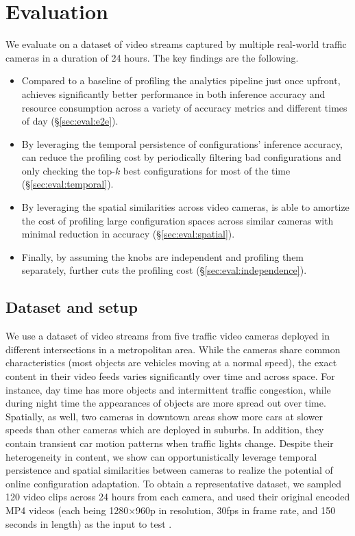 \section{Evaluation}

We evaluate \name on a dataset of video streams captured by multiple real-world traffic cameras in a duration of 24 hours. The key findings are the following.
\begin{itemize}
    \item Compared to a baseline of profiling the analytics pipeline just once upfront, \name achieves significantly better performance in both inference accuracy and resource consumption across a variety of accuracy metrics and different times of day (\S\ref{sec:eval:e2e}).
    \item By leveraging the temporal persistence of configurations' inference accuracy, \name can reduce the profiling cost by periodically filtering bad configurations and only checking the top-$k$ best configurations for most of the time  (\S\ref{sec:eval:temporal}).
    \item By leveraging the spatial similarities across video cameras, \name is able to amortize the cost of profiling large configuration spaces across similar cameras with minimal reduction in accuracy (\S\ref{sec:eval:spatial}).
    \item Finally, by assuming the knobs are independent and profiling them separately, \name further cuts the profiling cost
    (\S\ref{sec:eval:independence}).
\end{itemize}

\subsection{Dataset and setup}

We use a dataset of video streams from five traffic video cameras deployed in different intersections in a metropolitan area. While the cameras share common characteristics (\eg most objects are vehicles moving at a normal speed), the exact content in their video feeds varies significantly over time and across space. 
For instance, day time has more objects and intermittent traffic congestion, while during night time the appearances of objects are more spread out over time. Spatially, as well, two cameras in downtown areas show more cars at slower speeds than other cameras which are deployed in suburbs. In addition, they contain transient car motion patterns when traffic lights change.
Despite their heterogeneity in content, we show \name can opportunistically leverage temporal persistence and spatial similarities between cameras to realize the potential of online configuration adaptation. 
To obtain a representative dataset, we sampled 120 video clips across 24 hours from each camera, and used their original encoded MP4 videos (each being 1280$\times$960p in resolution, 30fps in frame rate, and 150 seconds in length) as the input to test \name. 

